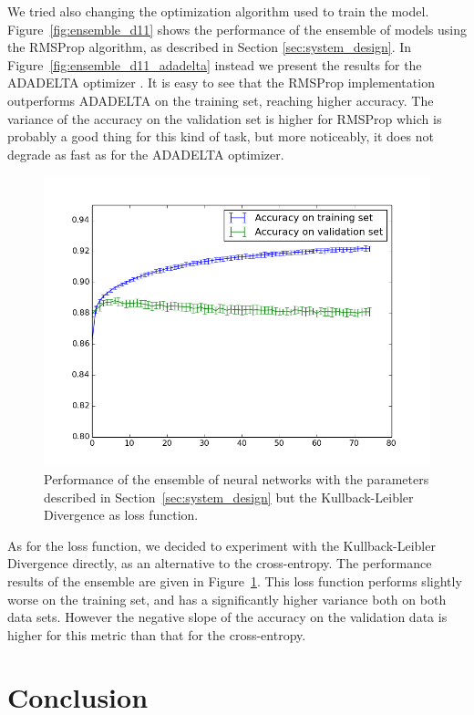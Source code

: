 \documentclass[conference]{IEEEtran}
\begin{document}
We tried also changing the optimization algorithm used to train the model. Figure~\ref{fig:ensemble_d11} shows the performance of the ensemble of models
using the RMSProp algorithm, as described in Section \ref{sec:system_design}. In
Figure~\ref{fig:ensemble_d11_adadelta} instead we present the results for the
ADADELTA optimizer \cite{zeiler2012adadelta}. It is easy to see that the RMSProp
implementation outperforms ADADELTA on the training set, reaching higher
accuracy. The variance of the accuracy on the validation set is higher for
RMSProp which is probably a good thing for this kind of task, but more
noticeably, it does not degrade as fast as for the ADADELTA optimizer.

\begin{figure}[!ht]
	\centering
	\includegraphics[width=.5\textwidth]{../imgs/ensemble_stats_d11_kld.png}
	\caption{Performance of the ensemble of neural networks with the parameters
	described in Section~\ref{sec:system_design} but the Kullback-Leibler
	Divergence as loss function.}
	\label{fig:ensemble_d11_kld}
\end{figure}

As for the loss function, we decided to experiment with the Kullback-Leibler
Divergence directly, as an alternative to the cross-entropy. The performance
results of the ensemble are given in Figure~\ref{fig:ensemble_d11_kld}. This
loss function performs slightly worse on the training set, and has a
significantly higher variance both on both data sets. However the negative slope
of the accuracy on the validation data is higher for this metric than that for
the cross-entropy.


\section{Conclusion}
\label{sec:conclusion}

\clearpage
\appendix
\end{document}
